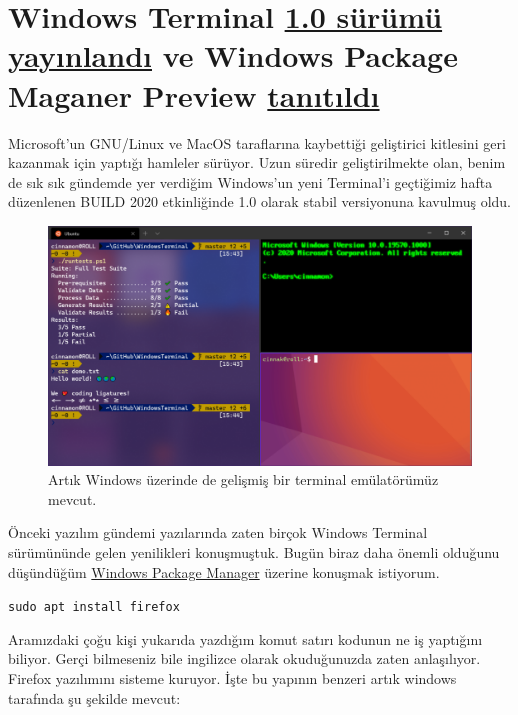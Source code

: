 \documentclass[11pt]{article}
\begin{document}
\section{Windows Terminal \href{https://devblogs.microsoft.com/commandline/windows-terminal-1-0/}{1.0 sürümü yayınlandı} ve Windows Package Maganer Preview \href{https://devblogs.microsoft.com/commandline/windows-package-manager-preview/}{tanıtıldı}}
\label{sec:orgee60836}
Microsoft'un GNU/Linux ve MacOS taraflarına kaybettiği geliştirici kitlesini
geri kazanmak için yaptığı hamleler sürüyor. Uzun süredir geliştirilmekte
olan, benim de sık sık gündemde yer verdiğim Windows'un yeni Terminal'i
geçtiğimiz hafta düzenlenen BUILD 2020 etkinliğinde 1.0 olarak stabil
versiyonuna kavulmuş oldu.

\begin{figure}[htbp]
\centering
\includegraphics[width=.9\linewidth]{gorseller/windows-terminal-1-0.png}
\caption{Artık Windows üzerinde de gelişmiş bir terminal emülatörümüz mevcut.}
\end{figure}
\newpage

Önceki yazılım gündemi yazılarında zaten birçok Windows Terminal sürümününde
gelen yenilikleri konuşmuştuk. Bugün biraz daha önemli olduğunu düşündüğüm
\href{https://github.com/microsoft/winget-cli}{Windows Package Manager} üzerine konuşmak istiyorum.

\texttt{sudo apt install firefox}

Aramızdaki çoğu kişi yukarıda yazdığım komut satırı kodunun ne iş yaptığını
biliyor. Gerçi bilmeseniz bile ingilizce olarak okuduğunuzda zaten
anlaşılıyor. Firefox yazılımını sisteme kuruyor. İşte bu yapının benzeri artık
windows tarafında şu şekilde mevcut:
\end{document}
